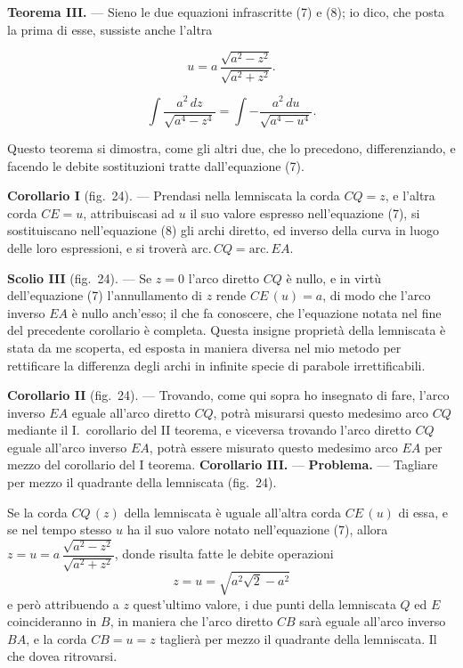 \documentclass{article}
\begin{document}
\textbf{Teorema III.} --- Sieno le due equazioni infrascritte (7) e (8); io dico, che posta
la prima di esse, sussiste anche l'altra

\[ u = a\, \frac{\sqrt{a^{2} - z^{2}}}{\sqrt{a^{2} + z^{2}}}. \tag{7} \]

\[ \int \frac{a^{2}\,dz}{\sqrt{a^{4} - z^{4}}} = \int -\frac{a^{2}\,du}{\sqrt{a^{4} - u^{4}}}. \tag{8} \]

Questo teorema si dimostra, come gli altri due, che lo precedono, differenziando, e facendo
le debite sostituzioni tratte dall'equazione (7).

\textbf{Corollario I} (fig.~24). --- Prendasi nella lemniscata la corda $CQ = z$, e l'altra
corda $CE = u$, attribuiscasi ad $u$ il suo valore espresso nell'equazione (7), si
sostituiscano nell'equazione (8) gli archi diretto, ed inverso della curva in luogo delle
loro espressioni, e si troverà $\mathrm{arc.}\,CQ = \mathrm{arc.}\,EA$.

\textbf{Scolio III} (fig.~24). --- Se $z = 0$ l'arco diretto $CQ$ è nullo, e in virtù
dell'equazione (7) l'annullamento di $z$ rende $CE\,(u) = a$, di modo che l'arco inverso $EA$
è nullo anch'esso; il che fa conoscere, che l'equazione notata nel fine del precedente
corollario è completa. Questa insigne proprietà della lemniscata è stata da me scoperta, ed
esposta in maniera diversa nel mio metodo per rettificare la differenza degli archi in infinite
specie di parabole irrettificabili.

\textbf{Corollario II} (fig.~24). --- Trovando, come qui sopra ho insegnato di fare, l'arco
inverso $EA$ eguale all'arco diretto $CQ$, potrà misurarsi questo medesimo arco $CQ$ mediante
il I.\ corollario del II teorema, e viceversa trovando l'arco diretto $CQ$ eguale all'arco
inverso $EA$, potrà essere misurato questo medesimo arco $EA$ per mezzo del corollario del I
teorema.
\textbf{Corollario III.} --- \textbf{Problema.} --- Tagliare per mezzo il quadrante della
lemniscata (fig.~24).

Se la corda $CQ\,(z)$ della lemniscata è uguale all'altra corda $CE\,(u)$ di essa, e se nel
tempo stesso $u$ ha il suo valore notato nell'equazione (7), allora
$z = u = a\, \dfrac{\sqrt{a^{2} - z^{2}}}{\sqrt{a^{2} + z^{2}}}$, donde risulta fatte le debite
operazioni
\[ z = u = \sqrt{a^{2}\sqrt{2} - a^{2}} \]
e però attribuendo a $z$ quest'ultimo valore, i due punti della lemniscata $Q$ ed $E$
coincideranno in $B$, in maniera che l'arco diretto $CB$ sarà eguale all'arco inverso $BA$, e
la corda $CB = u = z$ taglierà per mezzo il quadrante della lemniscata. Il che dovea
ritrovarsi.
\end{document}
